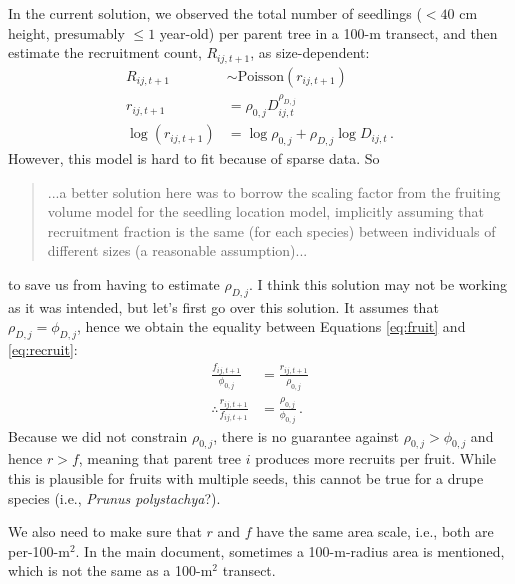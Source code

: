\documentclass[12pt,a4paper]{article}
\begin{document}
In the current solution, we observed the total number of seedlings ($< 40$ cm height, presumably $\le 1$ year-old) per parent tree in a 100-m transect, and then estimate the recruitment count, $R_{ij,t+1}$, as size-dependent:
\begin{align}
R_{ij,t+1} &\sim \text{Poisson}(r_{ij,t+1}) \\
r_{ij,t+1} &=  \rho_{0,j} D_{ij,t}^{\rho_{D,j}} \label{eq:recruit} \\
\log (r_{ij,t+1}) &= \log \rho_{0,j} + \rho_{D,j} \log D_{ij,t} \,.
\end{align}
However, this model is hard to fit because of sparse data. So
\begin{quote}
...a better solution here was to borrow the scaling factor from the fruiting volume model for the seedling location model, implicitly assuming that recruitment fraction is the same (for each species) between individuals of different sizes (a reasonable assumption)...
\end{quote}
to save us from having to estimate $\rho_{D,j}$. I think this solution may not be working as it was intended, but let's first go over this solution. It assumes that $\rho_{D,j} = \phi_{D,j}$, hence we obtain the equality between Equations \ref{eq:fruit} and \ref{eq:recruit}:
\begin{align}
\frac{f_{ij,t+1}}{\phi_{0,j}} &= \frac{r_{ij,t+1}}{\rho_{0,j}} \nonumber \\
\therefore \frac{r_{ij,t+1}}{f_{ij,t+1}} &= \frac{\rho_{0,j}}{\phi_{0,j}} \label{eq:rf_ratio} \,.
\end{align}
Because we did not constrain $\rho_{0,j}$, there is no guarantee against $\rho_{0,j} > \phi_{0,j}$ and hence $r > f$, meaning that parent tree $i$ produces more recruits per fruit. While this is plausible for fruits with multiple seeds, this cannot be true for a drupe species (i.e., \textit{Prunus polystachya}?).

We also need to make sure that $r$ and $f$ have the same area scale, i.e., both are per-100-m$^2$. In the main document, sometimes a 100-m-radius area is mentioned, which is not the same as a 100-m$^2$ transect.
\end{document}
